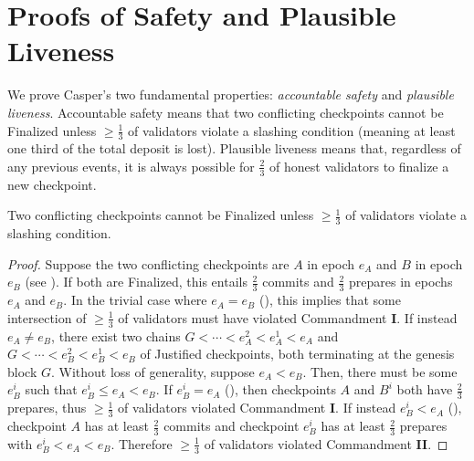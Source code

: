 \documentclass[12pt]{article}
\newcommand{\epoch}{\ensuremath{e}\xspace}
\newcommand{\Genesisblock}{\ensuremath{G}\xspace}
\begin{document}
\section{Proofs of Safety and Plausible Liveness}
\label{sect:theorems}

We prove Casper's two fundamental properties: \textit{accountable safety} and \textit{plausible liveness}. Accountable safety means that two conflicting checkpoints cannot be Finalized unless $\geq \frac{1}{3}$ of validators violate a slashing condition (meaning at least one third of the total deposit is lost).  Plausible liveness means that, regardless of any previous events, it is always possible for $\frac{2}{3}$ of honest validators to finalize a new checkpoint.

\begin{theorem}
\label{theorem:safety}
Two conflicting checkpoints cannot be Finalized unless $\geq \frac{1}{3}$ of validators violate a slashing condition.

\begin{proof}
Suppose the two conflicting checkpoints are $A$ in epoch $\epoch_A$ and $B$ in epoch $\epoch_B$ (see ). If both are Finalized, this entails $\frac{2}{3}$ commits and $\frac{2}{3}$ prepares in epochs $\epoch_A$ and $e_B$. In the trivial case where $\epoch_A = \epoch_B$ (), this implies that some intersection of $\geq \frac{1}{3}$ of validators must have violated Commandment \textbf{I}. If instead $\epoch_A \not= \epoch_B$, there exist two chains $\Genesisblock < \cdots < \epoch_A^2 < \epoch_A^1 < \epoch_A$ and $\Genesisblock < \cdots < \epoch_B^2 < \epoch_B^1 < \epoch_B$ of Justified checkpoints, both terminating at the genesis block $\Genesisblock$. Without loss of generality, suppose $\epoch_A < \epoch_B$. Then, there must be some $\epoch_B^i$ such that $\epoch_B^i \leq \epoch_A < \epoch_B$.  If $\epoch_B^i = \epoch_A$ (), then checkpoints $A$ and $B^i$ both have $\frac{2}{3}$ prepares, thus $\geq \frac{1}{3}$ of validators violated Commandment \textbf{I}.  If instead $\epoch_B^i < \epoch_A$ (), checkpoint $A$ has at least $\frac{2}{3}$ commits and checkpoint $\epoch_B^i$ has at least $\frac{2}{3}$ prepares with $\epoch_B^i < \epoch_A < \epoch_B$.  Therefore $\geq \frac{1}{3}$ of validators violated Commandment \textbf{II}. 
\end{proof}
\end{theorem}
\end{document}
